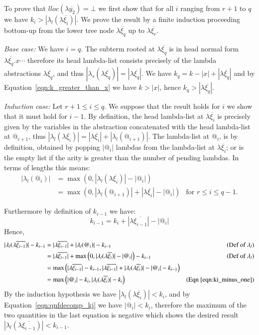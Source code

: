 \documentclass{elsarticle}
\theoremstyle{plain}
\theoremstyle{definition}
\theoremstyle{remark}
\begin{document}
\begin{enumerate}
To prove that $lloc(\lambda\overline{y_2}) =\bot$ we first show that for all $i$ ranging from $r+1$ to $q$ we have
 $k_i>|\lambda_l(\lambda\overline{\xi_i})|$. We prove the result by a finite induction proceeding bottom-up from the lower tree node
 $\lambda\overline{\xi_q}$ up to $\lambda\overline{\xi_r}$.

\emph{Base case:} We have $i=q$. The subterm
rooted at $\lambda\overline{\xi_q}$ is in head normal form
$\lambda\overline{\xi_q}. x \cdots$ therefore its head lambda-list consists precisely of the lambda abstractions $\lambda\overline{\xi_q}$, and thus
$|\lambda_s(\lambda\overline{\xi_q})| = |\lambda\overline{\xi_q}|$.
We have $k_q = k -|x| + |\lambda\overline{\xi_q}|$ and by Equation~\ref{eqn:k_greater_than_x} we have $k>|x|$, hence $k_q >|\lambda\overline{\xi_q}|$.


\emph{Induction case:} Let $r+1\leq i \leq q$. We suppose that the result holds for $i$ we show that it must hold for $i-1$. By definition, the head lambda-list at $\lambda\overline{\xi_i}$ is precisely given by the variables in the abstraction concatenated with the head lambda-list at $@_{i+1}$, thus $|\lambda_l(\lambda\overline{\xi_i})| =
|\lambda\overline{\xi_i}| + |\lambda_l(@_{i+1})|$. The lambda-list at $@_i$, is by definition, obtained by popping $|@_i|$ lambdas from the lambda-list at $\lambda\overline{\xi_i}$; or is the empty list if the arity is greater than the number of pending lambdas. In terms of lengths this means:
\begin{align*}
    |\lambda_l(@_i)| &= \max(0, |\lambda_l(\lambda\overline{\xi_i})| - |@_i|) \\
     &= \max\left( 0, |\lambda_l(@_{i+1})| + |\lambda\overline{\xi_i}| - |@_i| \right) & \mbox{for $r\leq i \leq q-1$.}
\end{align*}

Furthermore by definition of $k_{i-1}$ we have:
\begin{equation}
k_{i-1} = k_i + |\lambda\overline{\xi_{i-1}}| - |@_i| \label{eqn:ki_minus_one}
\end{equation}
Hence,
\begin{align*}
    |\lambda_l(\lambda\overline{\xi_{i-1}})| - k_{i-1}
    &= |\lambda\overline{\xi_{i-1}}| +|\lambda_l(@_i)| - k_{i-1} &\mbox{(Def~of $\lambda_l$)}\\
    &= |\lambda\overline{\xi_{i-1}}| + \max\left( 0, |\lambda_l(\lambda\overline{\xi_i})| - |@_i| \right) - k_{i-1} &\mbox{(Def~of $\lambda_l$)}\\
    &= \max\left( |\lambda\overline{\xi_{i-1}}| - k_{i-1},    |\lambda\overline{\xi_{i-1}}| + |\lambda_l(\lambda\overline{\xi_i})| - |@_i| - k_{i-1} \right) \\
    &= \max\left(  |@_i|- k_i, |\lambda_l(\lambda\overline{\xi_i})| - k_i \right) &\mbox{(Eqn~\ref{eqn:ki_minus_one})}
\end{align*}
By the induction hypothesis we have $|\lambda_l(\lambda\overline{\xi_i})| < k_i$, and by Equation~\ref{eqn:qnfdecomp_kj} we have $ |@_i|< k_i$, therefore the maximum of the two quantities in the last equation is negative which shows
the desired result $|\lambda_l(\lambda\overline{\xi_{i-1}})| < k_{i-1}$.


\end{enumerate}
\end{document}
